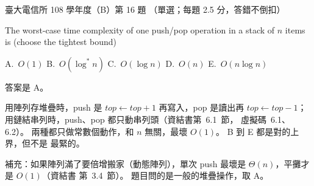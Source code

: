 \begin{pastexam}[label={px:ntu-108-comm-dsab-16}]{臺大電信所 108 學年度（B）第 16 題}
（單選；每題 2.5 分，答錯不倒扣）

The worst-case time complexity of one push/pop operation in a stack of $n$ items is (choose the
tightest bound)

A.~$O(1)$ \qquad B.~$O(\log^* n)$ \qquad C.~$O(\log n)$ \qquad D.~$O(n)$ \qquad E.~$O(n\log n)$
\end{pastexam}

\begin{pastsoln}
答案是 A。

用陣列存堆疊時，push 是 $\mathit{top} \gets \mathit{top} + 1$ 再寫入，pop 是讀出再
$\mathit{top} \gets \mathit{top} - 1$；用鏈結串列時，push、pop 都只動串列頭（資結書第~6.1~節，
虛擬碼~6.1、6.2）。 兩種都只做常數個動作，和 $n$ 無關，最壞 $O(1)$。 B 到 E 都是對的上界，但不是
最緊的。

補充：如果陣列滿了要倍增搬家（動態陣列），單次 push 最壞是 $\Theta(n)$，平攤才是 $O(1)$（資結書
第~3.4~節）。 題目問的是一般的堆疊操作，取 A。
\end{pastsoln}

